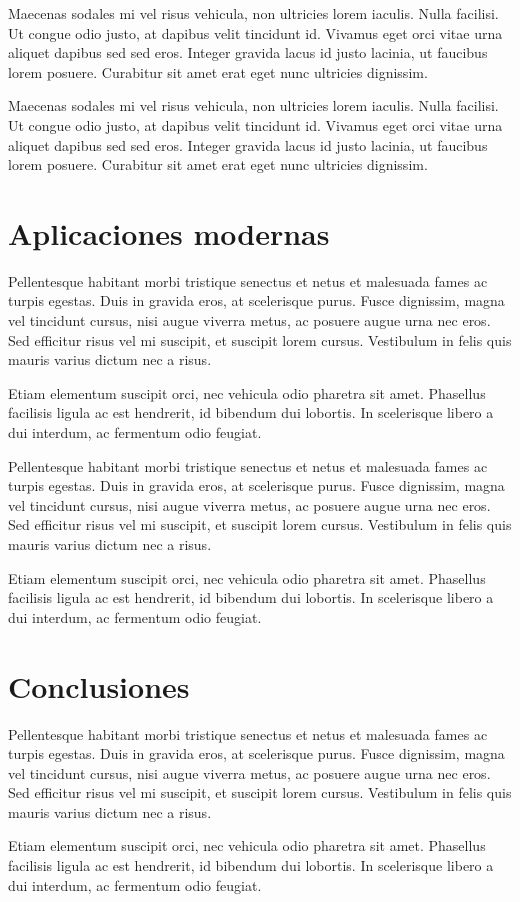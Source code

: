 Maecenas sodales mi vel risus vehicula, non ultricies lorem iaculis. Nulla facilisi. Ut congue odio justo, at dapibus velit tincidunt id. Vivamus eget orci vitae urna aliquet dapibus sed sed eros. Integer gravida lacus id justo lacinia, ut faucibus lorem posuere. Curabitur sit amet erat eget nunc ultricies dignissim.

Maecenas sodales mi vel risus vehicula, non ultricies lorem iaculis. Nulla facilisi. Ut congue odio justo, at dapibus velit tincidunt id. Vivamus eget orci vitae urna aliquet dapibus sed sed eros. Integer gravida lacus id justo lacinia, ut faucibus lorem posuere. Curabitur sit amet erat eget nunc ultricies dignissim.

\section{Aplicaciones modernas}

Pellentesque habitant morbi tristique senectus et netus et malesuada fames ac turpis egestas. Duis in gravida eros, at scelerisque purus. Fusce dignissim, magna vel tincidunt cursus, nisi augue viverra metus, ac posuere augue urna nec eros. Sed efficitur risus vel mi suscipit, et suscipit lorem cursus. Vestibulum in felis quis mauris varius dictum nec a risus.

Etiam elementum suscipit orci, nec vehicula odio pharetra sit amet. Phasellus facilisis ligula ac est hendrerit, id bibendum dui lobortis. In scelerisque libero a dui interdum, ac fermentum odio feugiat.

Pellentesque habitant morbi tristique senectus et netus et malesuada fames ac turpis egestas. Duis in gravida eros, at scelerisque purus. Fusce dignissim, magna vel tincidunt cursus, nisi augue viverra metus, ac posuere augue urna nec eros. Sed efficitur risus vel mi suscipit, et suscipit lorem cursus. Vestibulum in felis quis mauris varius dictum nec a risus.

Etiam elementum suscipit orci, nec vehicula odio pharetra sit amet. Phasellus facilisis ligula ac est hendrerit, id bibendum dui lobortis. In scelerisque libero a dui interdum, ac fermentum odio feugiat.

\section{Conclusiones}

Pellentesque habitant morbi tristique senectus et netus et malesuada fames ac turpis egestas. Duis in gravida eros, at scelerisque purus. Fusce dignissim, magna vel tincidunt cursus, nisi augue viverra metus, ac posuere augue urna nec eros. Sed efficitur risus vel mi suscipit, et suscipit lorem cursus. Vestibulum in felis quis mauris varius dictum nec a risus.

Etiam elementum suscipit orci, nec vehicula odio pharetra sit amet. Phasellus facilisis ligula ac est hendrerit, id bibendum dui lobortis. In scelerisque libero a dui interdum, ac fermentum odio feugiat.

